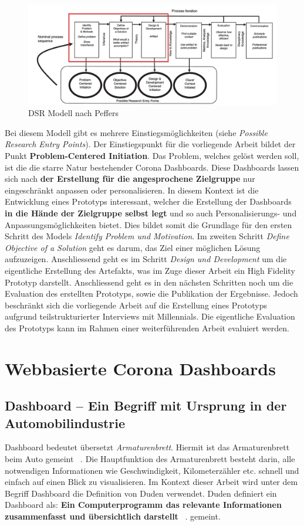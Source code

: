 \documentclass[12pt, oneside]{article}
\begin{document}
\begin{figure}[ht]
	\includegraphics[width=12cm]{images/peffers_dsr_model.png}
	\centering
	\caption{DSR Modell nach Peffers ~\citep{K.Peffers.2007}}
\end{figure}

Bei diesem Modell gibt es mehrere Einstiegsmöglichkeiten (siehe \textit{Possible Research Entry Points}). Der Einstiegspunkt für die vorliegende Arbeit bildet der Punkt \textbf{Problem-Centered Initiation}. Das Problem, welches gelöst werden soll, ist die die starre Natur bestehender Corona Dashboards. Diese Dashboards lassen sich nach \textbf{der Erstellung für die angesprochene Zielgruppe} nur eingeschränkt anpassen oder personalisieren. In diesem Kontext ist die Entwicklung eines Prototyps interessant, welcher die Erstellung der Dashboards \textbf{in die Hände der Zielgruppe selbst legt} und so auch Personalisierungs- und Anpassungsmöglichkeiten bietet. Dies bildet somit die Grundlage für den ersten Schritt des Models \textit{Identify Problem und Motivation}. Im zweiten Schritt \textit{Define Objective of a Solution} geht es darum, das Ziel einer möglichen Lösung aufzuzeigen. Anschliessend geht es im Schritt \textit{Design und Development} um die eigentliche Erstellung des Artefakts, was im Zuge dieser Arbeit ein High Fidelity Prototyp darstellt. Anschliessend geht es in den nächsten Schritten noch um die Evaluation des erstellten Prototyps, sowie die Publikation der Ergebnisse. Jedoch beschränkt sich die vorliegende Arbeit auf die Erstellung eines Prototyps aufgrund teilstrukturierter Interviews mit Millennials. Die eigentliche Evaluation des Prototyps kann im Rahmen einer weiterführenden Arbeit evaluiert werden.


\clearpage
\section{Webbasierte Corona Dashboards}

\subsection{Dashboard – Ein Begriff mit Ursprung in der Automobilindustrie}
    Dashboard bedeutet übersetzt \textit{Armaturenbrett}. Hiermit ist das Armaturenbrett beim Auto gemeint ~\citep{Duden.18.04.2022}. Die Hauptfunktion des Armaturenbrett besteht darin, alle notwendigen Informationen wie Geschwindigkeit, Kilometerzähler etc. schnell und einfach auf einen Blick zu visualisieren. Im Kontext dieser Arbeit wird unter dem Begriff Dashboard die Definition von Duden verwendet. Duden definiert ein Dashboard als: \textbf{Ein Computerprogramm das relevante Informationen zusammenfasst und übersichtlich darstellt} ~\citep{Duden.18.04.2022}. gemeint.
\end{document}
